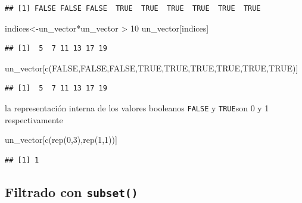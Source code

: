\documentclass[
]{book}
\newenvironment{Shaded}{\begin{snugshade}}{\end{snugshade}}
\newcommand{\ConstantTok}[1]{\textcolor[rgb]{0.00,0.00,0.00}{#1}}
\newcommand{\DecValTok}[1]{\textcolor[rgb]{0.00,0.00,0.81}{#1}}
\newcommand{\FunctionTok}[1]{\textcolor[rgb]{0.00,0.00,0.00}{#1}}
\newcommand{\NormalTok}[1]{#1}
\newcommand{\OtherTok}[1]{\textcolor[rgb]{0.56,0.35,0.01}{#1}}
\newcommand{\SpecialCharTok}[1]{\textcolor[rgb]{0.00,0.00,0.00}{#1}}
\begin{document}
\begin{verbatim}
## [1] FALSE FALSE FALSE  TRUE  TRUE  TRUE  TRUE  TRUE  TRUE
\end{verbatim}

\begin{Shaded}
\begin{Highlighting}[]
\NormalTok{indices}\OtherTok{\textless{}{-}}\NormalTok{un\_vector}\SpecialCharTok{*}\NormalTok{un\_vector }\SpecialCharTok{\textgreater{}} \DecValTok{10} 
\NormalTok{un\_vector[indices]}
\end{Highlighting}
\end{Shaded}

\begin{verbatim}
## [1]  5  7 11 13 17 19
\end{verbatim}

\begin{Shaded}
\begin{Highlighting}[]
\NormalTok{un\_vector[}\FunctionTok{c}\NormalTok{(}\ConstantTok{FALSE}\NormalTok{,}\ConstantTok{FALSE}\NormalTok{,}\ConstantTok{FALSE}\NormalTok{,}\ConstantTok{TRUE}\NormalTok{,}\ConstantTok{TRUE}\NormalTok{,}\ConstantTok{TRUE}\NormalTok{,}\ConstantTok{TRUE}\NormalTok{,}\ConstantTok{TRUE}\NormalTok{,}\ConstantTok{TRUE}\NormalTok{)]}
\end{Highlighting}
\end{Shaded}

\begin{verbatim}
## [1]  5  7 11 13 17 19
\end{verbatim}

la representación interna de los valores booleanos \texttt{FALSE} y \texttt{TRUE}son 0 y 1 respectivamente

\begin{Shaded}
\begin{Highlighting}[]
\NormalTok{un\_vector[}\FunctionTok{c}\NormalTok{(}\FunctionTok{rep}\NormalTok{(}\DecValTok{0}\NormalTok{,}\DecValTok{3}\NormalTok{),}\FunctionTok{rep}\NormalTok{(}\DecValTok{1}\NormalTok{,}\DecValTok{1}\NormalTok{))]}
\end{Highlighting}
\end{Shaded}

\begin{verbatim}
## [1] 1
\end{verbatim}

\hypertarget{filtrado-con-subset}{%
\subsection{\texorpdfstring{Filtrado con \texttt{subset()}}{Filtrado con subset()}}\label{filtrado-con-subset}}
\end{document}
